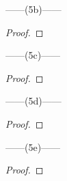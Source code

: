 \documentclass[12pt]{article}
\begin{document}
\noindent
\begin{center}
    ------(5b)------
\end{center} 
\begin{proof}
    
\end{proof}

\noindent
\begin{center}
    ------(5c)------
\end{center} 
\begin{proof}
    
\end{proof}

\noindent
\begin{center}
    ------(5d)------
\end{center} 
\begin{proof}
    
\end{proof}

\noindent
\begin{center}
    ------(5e)------
\end{center} 
\begin{proof}
    
\end{proof}
\end{document}
